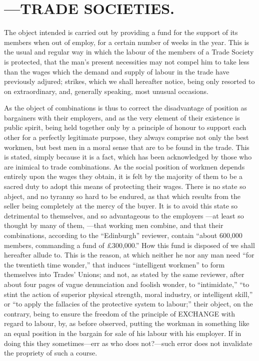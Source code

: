 \chapter{---TRADE SOCIETIES.} \label{TRADE_SOCIETIES}

The object intended is carried out by providing a fund for the support
of its members when out of employ, for a certain number of weeks in the
year. This is the usual and regular way in which the labour of the
members of a Trade Society is protected, that the man's present
necessities may not compel him to take less than the wages which the
demand and supply of labour in the trade have previously adjured;
strikes, which we shall hereafter notice, being only resorted to on
extraordinary, and, generally speaking, most unusual occasions.

As the object of combinations is thus to correct the disadvantage of
position as bargainers with their employers, and as the very element of
their existence is public spirit, being held together only by a
principle of honour to support each other for a perfectly legitimate
purpose, they always comprise not only the best workmen, but best men in
a moral sense that are to be found in the trade. This is stated, simply
because it is a fact, which has been acknowledged by those who are
inimical to trade combinations. As the social position of workmen
depends entirely upon the wages they obtain, it is felt by the majority
of them to be a sacred duty to adopt this means of protecting their
wages. There is no state so abject, and no tyranny so hard to be
endured, as that which results from the seller being completely at the
mercy of the buyer. It is to avoid this state so detrimental to
themselves, and so advantageous to the employers ---at least so thought
by many of them, ---that working men combine, and that their
combinations, according to the ``Edinburgh'' reviewer, contain ``about
600,000 members, commanding a fund of £300,000.'' How this fund is
disposed of we shall hereafter allude to. This is the reason, at which
neither he nor any man need ``for the twentieth time wonder,'' that
induces ``intelligent workmen'' to form themselves into Trades' Unions;
and not, as stated by the same reviewer, after about four pages of vague
denunciation and foolish wonder, to ``intimidate,'' ``to stint the
action of superior physical strength, moral industry, or intelligent
skill,'' or ``to apply the fallacies of the protective system to
labour;'' their object, on the contrary, being to ensure the freedom of
the principle of EXCHANGE with regard to labour, by, as before observed,
putting the workman in something like an equal position in the bargain
for sale of his labour with his employer. If in doing this they
sometimes---err as who does not?---such error does not invalidate the
propriety of such a course.

